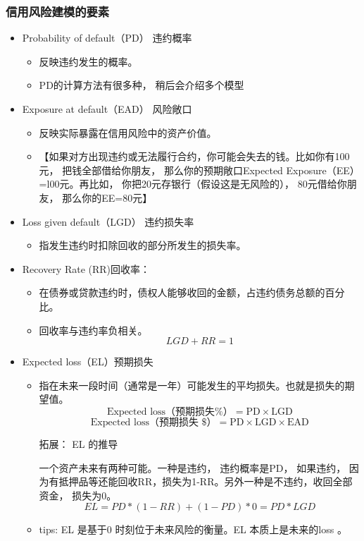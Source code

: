 \subsubsection{信用风险建模的要素}
\begin{itemize}
\item Probability of default（PD） 违约概率
    \begin{itemize}
    \item 反映违约发生的概率。
    \item PD的计算方法有很多种， 稍后会介绍多个模型
    \end{itemize}
\item Exposure at default（EAD） 风险敞口
    \begin{itemize}
    \item 反映实际暴露在信用风险中的资产价值。
    \item 【如果对方出现违约或无法履行合约，你可能会失去的钱。比如你有100元， 把钱全部借给你朋友， 那么你的预期敞口Expected Exposure（EE）=l00元。再比如， 你把20元存银行（假设这是无风险的）， 80元借给你朋友， 那么你的EE=80元】
    \end{itemize}
\item Loss given default（LGD） 违约损失率
    \begin{itemize}
    \item 指发生违约时扣除回收的部分所发生的损失率。
    \end{itemize}
\item Recovery Rate (RR)回收率：
    \begin{itemize}
    \item 在债券或贷款违约时，债权人能够收回的金额，占违约债务总额的百分比。
    \item  回收率与违约率负相关。
    \[LGD+RR=1\]

    \end{itemize}
\item Expected loss（EL）预期损失
    \begin{itemize}
    \item 指在未来一段时间（通常是一年）可能发生的平均损失。也就是损失的期望值。
\[\text{Expected loss（预期损失\%）} = \text{PD} \times \text{LGD}\]
\[\text{Expected loss（预期损失 \$）} = \text{PD} \times \text{LGD} \times \text{EAD}\]

\begin{note}{拓展： EL 的推导}

    一个资产未来有两种可能。一种是违约， 违约概率是PD， 如果违约， 因为有抵押品等还能回收RR，损失为1-RR。另外一种是不违约，收回全部资金， 损失为0。
$$EL=PD*(1-RR)+(1-PD)*0=PD * LGD$$

\end{note}

    \item tips: EL 是基于0 时刻位于未来风险的衡量。EL 本质上是未来的loss 。
    \end{itemize}
\end{itemize}



